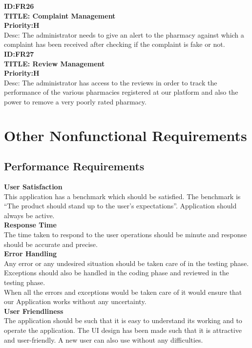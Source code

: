 \documentclass{scrreprt}
\begin{document}
 \textbf{ID:FR26}\\
\textbf{TITLE: Complaint Management}\\
 \textbf{Priority:H}\\
Desc: The administrator needs to give an alert to the pharmacy against which a complaint has been received after checking if the complaint is fake or not.\\

 \textbf{ID:FR27}\\
 \textbf{TITLE: Review Management}\\
 \textbf{Priority:H}\\
Desc: The administrator has access to the reviews in order to track the performance of the various pharmacies registered at our platform and also the power to remove a very poorly rated pharmacy.\\

\chapter{Other Nonfunctional Requirements}

\section{Performance Requirements}

 \textbf{User Satisfaction}\\
This application has a benchmark which should be satisfied. The benchmark is “The product should stand up to the user’s expectations”. Application should always be active.\\

 \textbf{Response Time}\\
The time taken to respond to the user operations should be minute and response should be accurate and precise.\\

 \textbf{Error Handling}\\
Any error or any undesired situation should be taken care of in the testing phase.\\
Exceptions should also be handled in the coding phase and reviewed in the testing phase.\\
When all the errors and exceptions would be taken care of it would ensure that our Application works without any uncertainty.\\

 \textbf{User Friendliness}\\ 
The application should be such that it is easy to understand its working and to operate the application. The UI design has been made such that it is attractive and user-friendly. A new user can also use without any difficulties.\\
\end{document}
